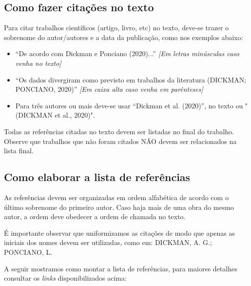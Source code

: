 \documentclass[a4paper,12pt]{article}
\begin{document}
	\subsection{Como fazer citações no texto}
	
	Para citar trabalhos científicos (artigo, livro, etc) no texto, deve-se trazer o sobrenome do autor/autores e a data da publicação, como nos exemplos abaixo:
	
	\begin{itemize}
		\item ``De acordo com Dickman e Ponciano (2020)...'' \textit{[Em letras minúsculas caso venha no texto]}
		\item ``Os dados divergiram como previsto em trabalhos da literatura (DICKMAN; PONCIANO, 2020)'' \textit{[Em caixa alta caso venha em parênteses]}
		\item Para três autores ou mais deve-se usar ``Dickman et al. (2020)'', no texto ou "(DICKMAN et al., 2020)".
	\end{itemize}
	
	Todas as referências citadas no texto devem ser listadas no final do trabalho. Observe que trabalhos que não foram citados NÃO devem ser relacionados na lista final.
	
	\subsection{Como elaborar a lista de referências}
	
	As referências devem ser organizadas em ordem alfabética de acordo com o último sobrenome do primeiro autor. Caso haja mais de uma obra do mesmo autor, a ordem deve obedecer a ordem de chamada no texto.
	
	É importante observar que uniformizamos as citações de modo que apenas as iniciais dos nomes devem ser utilizadas, como em: DICKMAN, A. G.; PONCIANO, L. 
	
	A seguir mostramos como montar a lista de referências, para maiores detalhes consultar os {\it links} disponibilizados acima:
	
\end{document}
